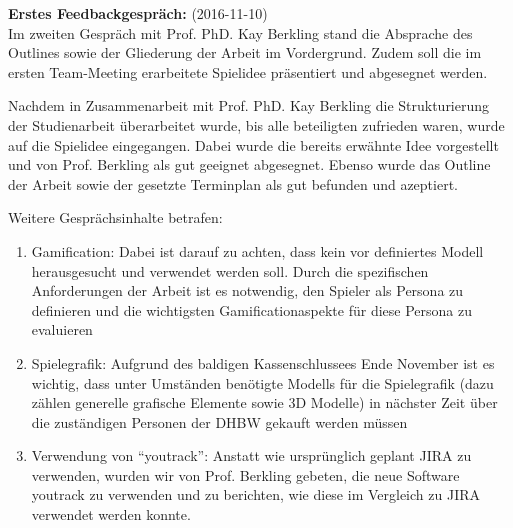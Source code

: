 \textbf{Erstes Feedbackgespräch:} (2016-11-10)\\
Im zweiten Gespräch mit Prof. PhD. Kay Berkling stand die Absprache des Outlines sowie der Gliederung der Arbeit im Vordergrund. Zudem soll die im ersten Team-Meeting erarbeitete Spielidee präsentiert und abgesegnet werden.

Nachdem in Zusammenarbeit mit Prof. PhD. Kay Berkling die Strukturierung der Studienarbeit überarbeitet wurde, bis alle beteiligten zufrieden waren, wurde auf die Spielidee eingegangen.
Dabei wurde die bereits erwähnte Idee vorgestellt und von Prof. Berkling als gut geeignet abgesegnet.
Ebenso wurde das Outline der Arbeit sowie der gesetzte Terminplan als gut befunden und azeptiert.

Weitere Gesprächsinhalte betrafen:
\begin{enumerate}
	\item Gamification: Dabei ist darauf zu achten, dass kein vor definiertes Modell herausgesucht und verwendet werden soll. Durch die spezifischen Anforderungen der Arbeit ist es notwendig, den Spieler als Persona zu definieren und die wichtigsten Gamificationaspekte für diese Persona zu evaluieren
	\item Spielegrafik: Aufgrund des baldigen Kassenschlussees Ende November ist es wichtig, dass unter Umständen benötigte Modells für die Spielegrafik (dazu zählen generelle grafische Elemente sowie 3D Modelle) in nächster Zeit über die zuständigen Personen der DHBW gekauft werden müssen
	\item Verwendung von \enquote{youtrack}: Anstatt wie ursprünglich geplant JIRA zu verwenden, wurden wir von Prof. Berkling gebeten, die neue Software youtrack zu verwenden und zu berichten, wie diese im Vergleich zu JIRA verwendet werden konnte.
\end{enumerate}



